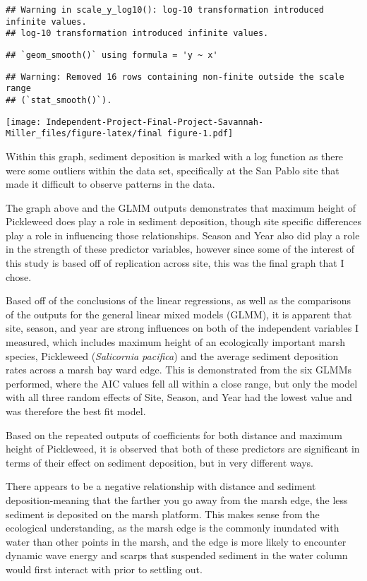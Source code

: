 \documentclass[
]{article}
\begin{document}
\begin{verbatim}
## Warning in scale_y_log10(): log-10 transformation introduced infinite values.
## log-10 transformation introduced infinite values.
\end{verbatim}

\begin{verbatim}
## `geom_smooth()` using formula = 'y ~ x'
\end{verbatim}

\begin{verbatim}
## Warning: Removed 16 rows containing non-finite outside the scale range
## (`stat_smooth()`).
\end{verbatim}

\texttt{[image: Independent-Project-Final-Project-Savannah-Miller\_files/figure-latex/final figure-1.pdf]}

Within this graph, sediment deposition is marked with a log function as
there were some outliers within the data set, specifically at the San
Pablo site that made it difficult to observe patterns in the data.

The graph above and the GLMM outputs demonstrates that maximum height of
Pickleweed does play a role in sediment deposition, though site specific
differences play a role in influencing those relationships. Season and
Year also did play a role in the strength of these predictor variables,
however since some of the interest of this study is based off of
replication across site, this was the final graph that I chose.

Based off of the conclusions of the linear regressions, as well as the
comparisons of the outputs for the general linear mixed models (GLMM),
it is apparent that site, season, and year are strong influences on both
of the independent variables I measured, which includes maximum height
of an ecologically important marsh species, Pickleweed (\emph{Salicornia
pacifica}) and the average sediment deposition rates across a marsh bay
ward edge. This is demonstrated from the six GLMMs performed, where the
AIC values fell all within a close range, but only the model with all
three random effects of Site, Season, and Year had the lowest value and
was therefore the best fit model.

Based on the repeated outputs of coefficients for both distance and
maximum height of Pickleweed, it is observed that both of these
predictors are significant in terms of their effect on sediment
deposition, but in very different ways.

There appears to be a negative relationship with distance and sediment
deposition-meaning that the farther you go away from the marsh edge, the
less sediment is deposited on the marsh platform. This makes sense from
the ecological understanding, as the marsh edge is the commonly
inundated with water than other points in the marsh, and the edge is
more likely to encounter dynamic wave energy and scarps that suspended
sediment in the water column would first interact with prior to settling
out.
\end{document}
